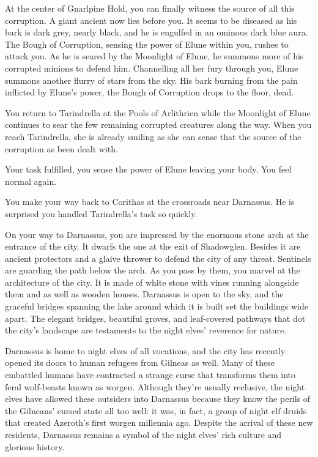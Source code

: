 At the center of Gnarlpine Hold, you can finally witness the source of all this corruption. A giant ancient now lies before you. It seems to be diseased as his bark is dark grey, nearly black, and he is engulfed in an ominous dark blue aura. The Bough of Corruption, sensing the power of Elune within you, rushes to attack you. As he is seared by the Moonlight of Elune, he summons more of his corrupted minions to defend him. Channelling all her fury through you, Elune summons another flurry of stars from the sky. His bark burning from the pain inflicted by Elune's power, the Bough of Corruption drops to the floor, dead.

You return to Tarindrella at the Pools of Arlithrien while the Moonlight of Elune continues to sear the few remaining corrupted creatures along the way. When you reach Tarindrella, she is already smiling as she can sense that the source of the corruption as been dealt with.


Your task fulfilled, you sense the power of Elune leaving your body. You feel normal again.


You make your way back to Corithas at the crossroads near Darnassus. He is surprised you handled Tarindrella's task so quickly.



On your way to Darnassus, you are impressed by the enormous stone arch at the entrance of the city. It dwarfs the one at the exit of Shadowglen. Besides it are ancient protectors and a glaive thrower to defend the city of any threat. Sentinels are guarding the path below the arch. As you pass by them, you marvel at the architecture of the city. It is made of white stone with vines running alongside them and as well as wooden houses. Darnassus is open to the sky, and the graceful bridges spanning the lake around which it is built set the buildings wide apart. The elegant bridges, beautiful groves, and leaf-covered pathways that dot the city’s landscape are testaments to the night elves’ reverence for nature.

Darnassus is home to night elves of all vocations, and the city has recently opened its doors to human refugees from Gilneas as well. Many of these embattled humans have contracted a strange curse that transforms them into feral wolf-beasts known as worgen. Although they’re usually reclusive, the night elves have allowed these outsiders into Darnassus because they know the perils of the Gilneans’ cursed state all too well: it was, in fact, a group of night elf druids that created Azeroth’s first worgen millennia ago. Despite the arrival of these new residents, Darnassus remains a symbol of the night elves’ rich culture and glorious history.

